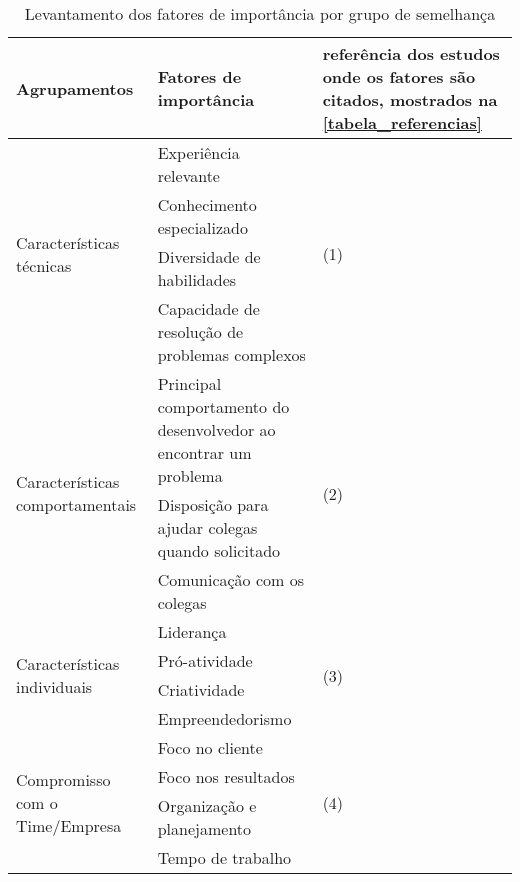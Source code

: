 \begin{table}[h]
	\caption{Levantamento dos fatores de importância por grupo de semelhança}
	\label{tabela1}
	\def\arraystretch{1.5}
	\begin{tabular}{|p{4cm}|p{6.25cm}|p{4cm}|}
		\hline
		\textbf{Agrupamentos} & \textbf{Fatores de importância} & \textbf{referência dos estudos onde os fatores são citados, mostrados na \autoref{tabela_referencias}} 
		\\ \hline
		
		\multirow{4}{*}{\parbox{4cm}{Características técnicas}} & Experiência relevante & \multirow{4}{*}{(1)}
		\\ \cline{2-2} & Conhecimento especializado & 
		\\ \cline{2-2} & Diversidade de habilidades & 
		\\ \cline{2-2} & Capacidade de resolução de problemas complexos & 
		\\ \hline
		
		\multirow{3}{*}{\parbox{4cm}{Características comportamentais}} & Principal comportamento do desenvolvedor ao encontrar um problema & \multirow{3}{*}{(2)}
		\\ \cline{2-2} & Disposição para ajudar colegas quando solicitado & 
		\\ \cline{2-2} & Comunicação com os colegas & 
		\\ \hline
		
		\multirow{4}{*}{\parbox{4cm}{Características individuais}} & Liderança & \multirow{4}{*}{(3)}
		\\ \cline{2-2} & Pró-atividade & 
		\\ \cline{2-2} & Criatividade & 
		\\ \cline{2-2} & Empreendedorismo & 
		\\ \hline
		
		\multirow{4}{*}{\parbox{4cm}{Compromisso com o Time/Empresa}}  & Foco no cliente & \multirow{4}{*}{(4)}
		\\ \cline{2-2} & Foco nos resultados & 
		\\ \cline{2-2} & Organização e planejamento & 
		\\ \cline{2-2} & Tempo de trabalho & 
		\\ \hline
	\end{tabular}
\end{table}

